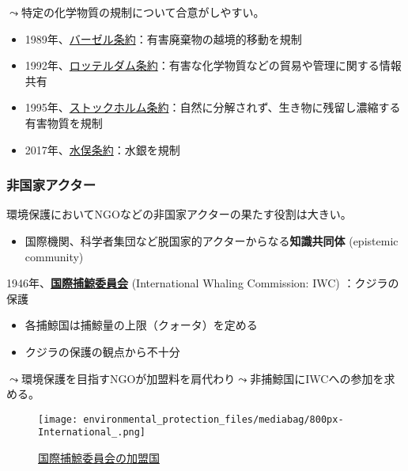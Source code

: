 \documentclass[
  xelatex,
  ja=standard]{bxjsarticle}
\providecommand{\tightlist}{%
  \setlength{\itemsep}{0pt}\setlength{\parskip}{0pt}}\usepackage{longtable,booktabs,array}
\begin{document}
\(\leadsto\)特定の化学物質の規制について合意がしやすい。

\begin{itemize}
\tightlist
\item
  1989年、\href{https://www.mofa.go.jp/mofaj/gaiko/kankyo/jyoyaku/basel.html}{バーゼル条約}：有害廃棄物の越境的移動を規制
\item
  1992年、\href{https://www.mofa.go.jp/mofaj/gaiko/kankyo/jyoyaku/rotterda.html}{ロッテルダム条約}：有害な化学物質などの貿易や管理に関する情報共有
\item
  1995年、\href{https://www.mofa.go.jp/mofaj/gaiko/kankyo/jyoyaku/pops.html}{ストックホルム条約}：自然に分解されず、生き物に残留し濃縮する有害物質を規制
\item
  2017年、\href{https://www.mofa.go.jp/mofaj/gaiko/kankyo/jyoyaku/suigin.html}{水俣条約}：水銀を規制
\end{itemize}

\hypertarget{ux975eux56fdux5bb6ux30a2ux30afux30bfux30fc}{%
\subsubsection{非国家アクター}\label{ux975eux56fdux5bb6ux30a2ux30afux30bfux30fc}}

環境保護においてNGOなどの非国家アクターの果たす役割は大きい。

\begin{itemize}
\tightlist
\item
  国際機関、科学者集団など脱国家的アクターからなる\textbf{知識共同体}
  (epistemic community)
\end{itemize}

1946年、\href{https://www.mofa.go.jp/mofaj/gaiko/whale/iwc.html}{\textbf{国際捕鯨委員会}}
(International Whaling Commission: IWC) ：クジラの保護

\begin{itemize}
\tightlist
\item
  各捕鯨国は捕鯨量の上限（クォータ）を定める
\item
  クジラの保護の観点から不十分
\end{itemize}

\(\leadsto\)環境保護を目指すNGOが加盟料を肩代わり\(\leadsto\)非捕鯨国にIWCへの参加を求める。

\begin{figure}[htpb]

{\centering \texttt{[image: environmental\_protection\_files/mediabag/800px-International\_.png]}

}

\caption{\href{https://commons.wikimedia.org/wiki/File:International_Whaling_Commission_members.svg}{国際捕鯨委員会の加盟国}}

\end{figure}
\end{document}
